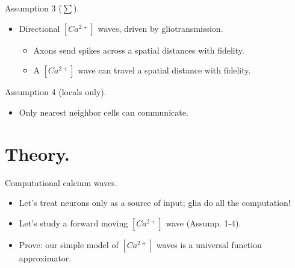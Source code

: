 \documentclass[10pt]{beamer}
\begin{document}
\begin{frame}[fragile]{Assumption 3 ($\sum$).}
\begin{itemize}
    \item \alert{Directional} $[Ca^{2+}]$ waves, driven by gliotransmission.
    \begin{itemize}
    \item Axons send spikes across a spatial distances with fidelity.
    \item A $[Ca^{2+}]$ wave can travel a spatial distance with fidelity.
    \end{itemize}
\end{itemize}
\end{frame}

\begin{frame}[fragile]{Assumption 4 (locals only).}
\begin{itemize}
    \item Only nearest neighbor cells can communicate.
\end{itemize}
\end{frame}

\section[In theory.]{Theory.}
\begin{frame}[fragile]{Computational calcium waves.}
\begin{itemize}
\item Let's treat neurons only as a source of input; glia do all the computation!
\item Let's study a forward moving $[Ca^{2+}]$ wave (Assump. 1-4).
\item \alert{Prove}: our simple model of $[Ca^{2+}]$ waves is a universal function approximator.
\end{itemize}
\end{frame}


\end{document}
